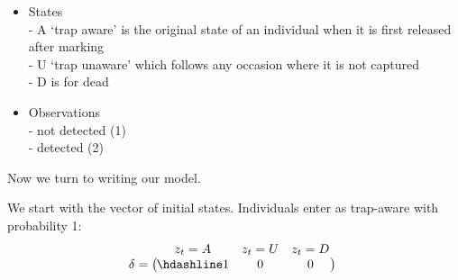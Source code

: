 \documentclass[
  12pt,
]{krantz}
\begin{document}
\begin{itemize}
\item
  States\\
  - A `trap aware' is the original state of an individual when it is first released after marking\\
  - U `trap unaware' which follows any occasion where it is not captured\\
  - D is for dead
\item
  Observations\\
  - not detected (1)\\
  - detected (2)
\end{itemize}

Now we turn to writing our model.

We start with the vector of initial states. Individuals enter as trap-aware with probability 1:
\[\begin{matrix}
& \\
\mathbf{\delta} =
\left ( \vphantom{ \begin{matrix} 12 \end{matrix} } \right .
\end{matrix}
\hspace{-1.2em}
\begin{matrix}
z_t=A & z_t=U & z_t=D \\ \hdashline
1 & 0 & 0\\
\end{matrix}
\hspace{-0.2em}
\begin{matrix}
& \\
\left . \vphantom{ \begin{matrix} 12 \end{matrix} } \right )
\begin{matrix}
\end{matrix}
\end{matrix}\]
\end{document}
